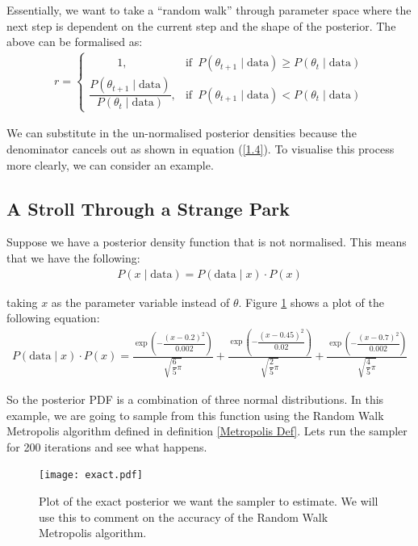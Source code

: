 \documentclass[12pt,twoside]{report}   %
\newcommand{\bkt}[1]{\left( #1 \right)}
\begin{document}
Essentially, we want to take a ``random walk'' through parameter space where the next step is dependent on the current step and the shape of the posterior. The above can be formalised as:
\begin{align}
r=\begin{cases}
	\quad\quad\,\,\,1,&\text{if}\,\,\,P(\theta_{t+1}\mid\text{data})\geq P(\theta_t\mid\text{data})\\
	\dfrac{P(\theta_{t+1}\mid\text{data})}{P(\theta_t\mid\text{data})},&\text{if}\,\,\,P(\theta_{t+1}\mid\text{data})<P(\theta_t\mid\text{data})
\end{cases}\label{2.1}
\end{align}

We can substitute in the un-normalised posterior densities because the denominator cancels out as shown in equation (\ref{1.4}). To visualise this process more clearly, we can consider an example.

\subsection{A Stroll Through a Strange Park}\label{Metropolis Example}
\vspace{-0.35in}
\underline{\hspace{6.2in}}
\vspace{-0.1in}

Suppose we have a posterior density function that is not normalised. This means that we have the following:
\begin{align*}
P(x\mid \text{data}) = P(\text{data}\mid x)\cdot P(x)
\end{align*}

taking $x$ as the parameter variable instead of $\theta$. Figure \ref{fig1.2} shows a plot of the following equation:
\begin{align*}
P(\text{data}\mid x)\cdot P(x) = \frac{\exp\bkt{-\dfrac{(x - 0.2)^2}{0.002}}}{\sqrt{\dfrac{6}{5}\pi}} + \frac{\exp\bkt{-\dfrac{(x - 0.45)^2}{0.02}}}{\sqrt{\dfrac{2}{5}\pi}} + \frac{\exp\bkt{-\dfrac{(x - 0.7)^2}{0.002}}}{\sqrt{\dfrac{4}{5}\pi}}
\end{align*}

So the posterior PDF is a combination of three normal distributions. In this example, we are going to sample from this function using the Random Walk Metropolis algorithm defined in definition \ref{Metropolis Def}. Lets run the sampler for 200 iterations and see what happens.
\begin{figure}[H]
\centering
\texttt{[image: exact.pdf]}
\vspace{-12pt}
\caption{Plot of the exact posterior we want the sampler to estimate. We will use this to comment on the accuracy of the Random Walk Metropolis algorithm.}
\label{fig1.2}
\end{figure}
\end{document}
